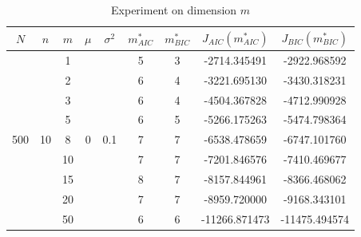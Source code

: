 \documentclass{article}
\begin{document}
\begin{table}[htbp]
	\centering
	\newcommand{\tabincell}[2]{\begin{tabular}{@{}#1@{}}#2\end{tabular}}
	\renewcommand\arraystretch{1.0}
	\caption{Experiment on dimension $m$}
	\label{m}%
	\begin{tabular}{c|c|c|c|c|c|c|c|c}
    $N$ & $n$ & $m$ & $\mu$ & $\sigma^2$ & $m^*_{AIC}$ & $m^*_{BIC}$ & $J_{AIC}(m^*_{AIC})$ &$J_{BIC}(m^*_{BIC})$\\
    \hline
		\multirow{9}{*}{500} & \multirow{9}{*}{10} & 1 & \multirow{9}{*}{0} & \multirow{9}{*}{0.1} & 5 & 3 & -2714.345491 & -2922.968592\\
     & & 2 & & & 6 & 4 & -3221.695130 & -3430.318231\\
     & & 3 & & & 6 & 4 & -4504.367828 & -4712.990928\\
     & & 5 & & & 6 & 5 & -5266.175263 & -5474.798364\\
     & & 8 & & & 7 & 7 & -6538.478659 & -6747.101760\\
     & & 10 & & & 7 & 7 & -7201.846576 & -7410.469677\\
     & & 15 & & & 8 & 7 & -8157.844961 & -8366.468062\\
     & & 20 & & & 7 & 7 & -8959.720000 & -9168.343101\\
     & & 50 & & & 6 & 6 & -11266.871473 & -11475.494574\\
		\hline
\end{tabular}
\end{table}
\end{document}
